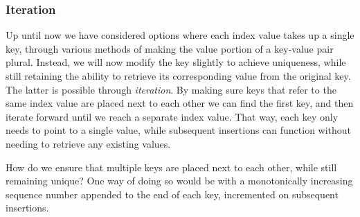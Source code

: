 \subsubsection{Iteration}

Up until now we have considered options where each index value takes up a single
key, through various methods of making the value portion of a key-value pair
plural. Instead, we will now modify the key slightly to achieve uniqueness,
while still retaining the ability to retrieve its corresponding value from the
original key. The latter is possible through \textit{iteration}. By making sure
keys that refer to the same index value are placed next to each other we can
find the first key, and then iterate forward until we reach a separate index
value. That way, each key only needs to point to a single value, while
subsequent insertions can function without needing to retrieve any existing
values.

How do we ensure that multiple keys are placed next to each other, while still
remaining unique? One way of doing so would be with a monotonically increasing
sequence number appended to the end of each key, incremented on subsequent
insertions.

